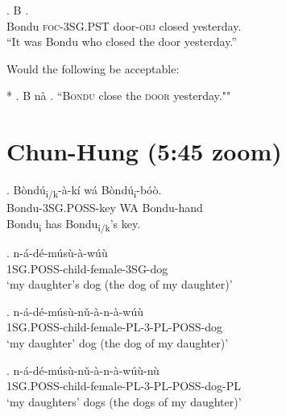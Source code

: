 \documentclass{assets/fieldnotes}
\begin{document}
\exg. B    .\\
Bondu \textsc{foc-3SG.PST} door-\textsc{obj} closed yesterday.\\
``It was Bondu who closed the door yesterday.''

Would the following be acceptable:

* \ex. B   n\`a  .
``\textsc{Bondu} close the \textsc{door} yesterday.""


\section{Chun-Hung (5:45 zoom)}


\exg. B\`{o}nd\'{u}\textsubscript{i/k}-\`{a}-k\'{i} w\'{a} B\`{o}nd\'{u}\textsubscript{i}-b\'{o}\`{o}. \\
Bondu-3SG.POSS-key WA Bondu-hand \\ 
Bondu\textsubscript{i} has Bondu\textsubscript{i/k}'s key. 

\exg. n-\'{a}-d\'{e}-m\'{u}s\`{u}-\`{a}-w\'{u}\`{u} \\
1SG.POSS-child-female-3SG-dog \\
`my daughter's dog (the dog of my daughter)' 

\exg. n-\'{a}-d\'{e}-m\'{u}s\`{u}-n\v{u}-\`{a}-n-\`{a}-w\'{u}\`{u} \\
1SG.POSS-child-female-PL-3-PL-POSS-dog \\
`my daughter' dog (the dog of my daughter)' 

\exg. n-\'{a}-d\'{e}-m\'{u}s\`{u}-n\v{u}-\`{a}-n-\`{a}-w\'{u}\`{u}-n\`{u} \\
1SG.POSS-child-female-PL-3-PL-POSS-dog-PL \\
`my daughters' dogs (the dogs of my daughter)'


 \newline

\end{document}
